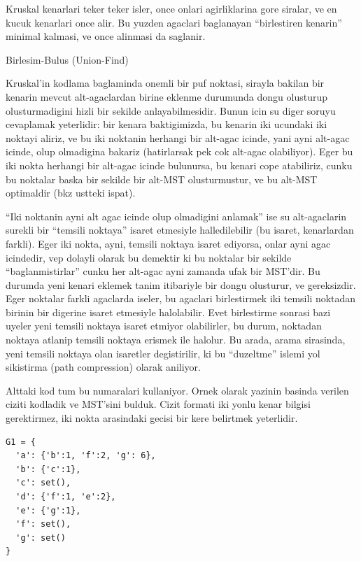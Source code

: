 \documentclass[12pt,fleqn]{article}\usepackage{../common}
\begin{document}
Kruskal kenarlari teker teker isler, once onlari agirliklarina gore
siralar, ve en kucuk kenarlari once alir. Bu yuzden agaclari baglanayan
``birlestiren kenarin'' minimal kalmasi, ve once alinmasi da saglanir.

Birlesim-Bulus (Union-Find)

Kruskal'in kodlama baglaminda onemli bir puf noktasi, sirayla bakilan bir
kenarin mevcut alt-agaclardan birine eklenme durumunda dongu olusturup
olusturmadigini hizli bir sekilde anlayabilmesidir. Bunun icin su diger
soruyu cevaplamak yeterlidir: bir kenara baktigimizda, bu kenarin iki
ucundaki iki noktayi aliriz, ve bu iki noktanin herhangi bir alt-agac
icinde, yani ayni alt-agac icinde, olup olmadigina bakariz (hatirlarsak pek
cok alt-agac olabiliyor). Eger bu iki nokta herhangi bir alt-agac icinde
bulunursa, bu kenari cope atabiliriz, cunku bu noktalar baska bir sekilde
bir alt-MST olusturmustur, ve bu alt-MST optimaldir (bkz ustteki ispat).

``Iki noktanin ayni alt agac icinde olup olmadigini anlamak'' ise su
alt-agaclarin surekli bir ``temsili noktaya'' isaret etmesiyle
halledilebilir (bu isaret, kenarlardan farkli). Eger iki nokta, ayni,
temsili noktaya isaret ediyorsa, onlar ayni agac icindedir, vep dolayli
olarak bu demektir ki bu noktalar bir sekilde ``baglanmistirlar'' cunku her
alt-agac ayni zamanda ufak bir MST'dir. Bu durumda yeni kenari eklemek
tanim itibariyle bir dongu olusturur, ve gereksizdir. Eger noktalar farkli
agaclarda iseler, bu agaclari birlestirmek iki temsili noktadan birinin bir
digerine isaret etmesiyle halolabilir. Evet birlestirme sonrasi bazi uyeler
yeni temsili noktaya isaret etmiyor olabilirler, bu durum, noktadan noktaya
atlanip temsili noktaya erismek ile halolur. Bu arada, arama sirasinda,
yeni temsili noktaya olan isaretler degistirilir, ki bu ``duzeltme'' islemi
yol sikistirma (path compression) olarak aniliyor.

Alttaki kod tum bu numaralari kullaniyor. Ornek olarak yazinin basinda
verilen ciziti kodladik ve MST'sini bulduk. Cizit formati iki yonlu
kenar bilgisi gerektirmez, iki nokta arasindaki gecisi bir kere belirtmek
yeterlidir. 

\begin{verbatim}
G1 = {
  'a': {'b':1, 'f':2, 'g': 6},
  'b': {'c':1},
  'c': set(),
  'd': {'f':1, 'e':2},
  'e': {'g':1},
  'f': set(),
  'g': set()
}
\end{verbatim}
\end{document}
